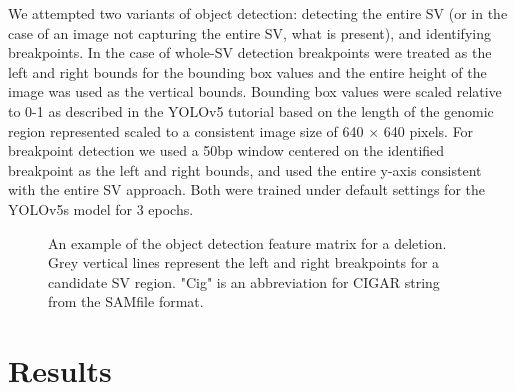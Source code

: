 We attempted two variants of object detection: detecting the entire SV (or in the case of an image not capturing the entire SV, what is present), and identifying breakpoints. In the case of whole-SV detection breakpoints were treated as the left and right bounds for the bounding box values and the entire height of the image was used as the vertical bounds. Bounding box values were scaled relative to 0-1 as described in the YOLOv5 tutorial based on the length of the genomic region represented scaled to a consistent image size of 640 $\times$ 640 pixels. For breakpoint detection we used a 50bp window centered on the identified breakpoint as the left and right bounds, and used the entire y-axis consistent with the entire SV approach. Both were trained under default settings for the YOLOv5s model for 3 epochs.

\begin{figure}
    \centering
    \caption[Sample representations of the object detection feature matrix.]{An example of the object detection feature matrix for a deletion. Grey vertical lines represent the left and right breakpoints for a candidate SV region. "Cig" is an abbreviation for CIGAR string from the SAMfile format.}
    \label{fig:example_pileup}
\end{figure}

\section{Results}

